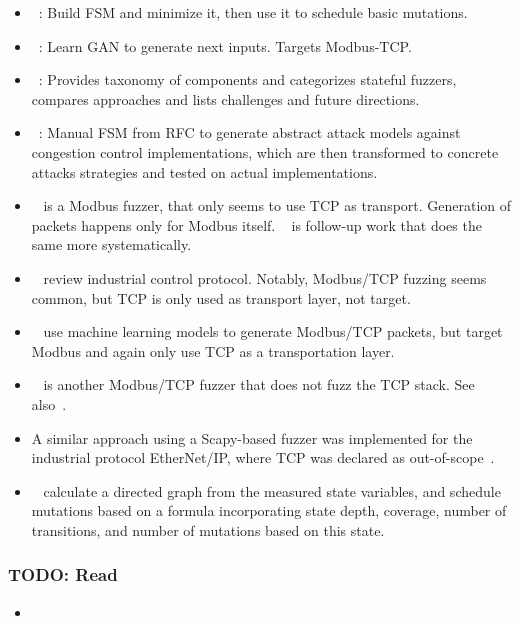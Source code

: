 \documentclass{article}
\let\savedCite=\cite
\renewcommand{\cite}{\unskip~\savedCite}
\begin{document}
\begin{multicols}{2}
\begin{itemize}
    \item {}\cite{ModelBased}: Build FSM and minimize it, then use it to schedule basic mutations.
    \item {}\cite{GANFuzz}: Learn GAN to generate next inputs. Targets Modbus-TCP.
    \item {}\cite{StatefulReview}: Provides taxonomy of components and categorizes stateful fuzzers, compares approaches and lists challenges and future directions.
    \item {}\cite{Congestion}: Manual FSM from RFC to generate abstract attack models against congestion control implementations, which are then transformed to concrete attacks strategies and tested on actual implementations.
    \item {}\cite{ModbusTCP} is a Modbus fuzzer, that only seems to use TCP as transport. Generation of packets happens only for Modbus itself. \cite{MTFStorm} is follow-up work that does the same more systematically.
    \item {}\cite{IndustrialReview} review industrial control protocol. Notably, Modbus/TCP fuzzing seems common, but TCP is only used as transport layer, not target.

    \item {}\cite{MTA} use machine learning models to generate Modbus/TCP packets, but target Modbus and again only use TCP as a transportation layer.
    \item {}\cite{AnotherModbusTCP} is another Modbus/TCP fuzzer that does not fuzz the TCP stack. See also\cite{ModbusTCP2}.
    \item A similar approach using a Scapy-based fuzzer was implemented for the industrial protocol EtherNet/IP, where TCP was declared as out-of-scope\cite{ENIP}.
    \item {}\cite{StateMachine} calculate a directed graph from the measured state variables, and schedule mutations based on a formula incorporating state depth, coverage, number of transitions, and number of mutations based on this state.
  \end{itemize}

  \subsubsection{TODO: Read}
  \begin{itemize}
    \item {}\cite{Survey}
  \end{itemize}


\end{multicols}
\end{document}
